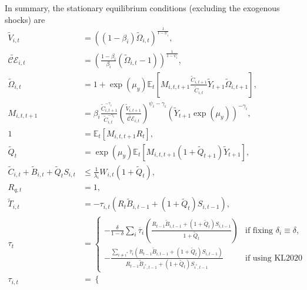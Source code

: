 \documentclass[12 pt, oneside]{article}
\theoremstyle{definition}
\theoremstyle{definition}
\theoremstyle{definition}
\newcommand{\E}{\mathbb{E}}
\newcommand{\calC}{\mathcal{C}}
\newcommand{\calE}{\mathcal{E}}
\begin{document}
In summary, the stationary equilibrium conditions (excluding the exogenous shocks) are
\begin{align}
  \label{eq:epstein zin defn eqm stat}
  \tilde{V}_{i, t} & = ((1 - \beta_i)\tilde{\Omega}_{i, t})^{\frac{1}{1 - \psi_i}},\\
  \label{eq:certainty equivalent eqm stat}
  \tilde{\calC\calE}_{i, t} & = \left(\frac{1 - \beta_i}{\beta_i}(\tilde{\Omega}_{i, t} - 1)\right)^{\frac{1}{1 - \psi_i}},\\
  \label{eq:epstein zin wealth recursion eqm stat}
  \tilde{\Omega}_{i, t} & = 1 + \exp(\mu_y)\E_t\left[M_{i, t, t + 1}\frac{\tilde{C}_{i, t + 1}}{\tilde{C}_{i, t}}\tilde{Y}_{t + 1}\tilde{\Omega}_{i, t + 1}\right],\\
  \label{eq:stochastic discount factor eqm stat}
  M_{i, t, t + 1} & = \beta_i\frac{\tilde{C}_{i, t + 1}^{- \gamma_i } }{\tilde{C}_{i, t}^{-\gamma_i} }\left(\frac{\tilde{V}_{i, t + 1}}{\tilde{\calC\calE}_{i, t}}\right)^{ \psi_i - \gamma_i}\left(\tilde{Y}_{t + 1}\exp(\mu_y)\right)^{-\gamma_i},\\
  \label{eq:euler eqn eqm stat}
  1 & = \E_t\left[M_{i, t, t + 1}R_t\right],\\
  \label{eq:tree asset pricing eqm stat}
  \tilde{Q}_t & = \exp(\mu_y)\E_t[M_{i, t, t + 1}(1 + \tilde{Q}_{t + 1})\tilde{Y}_{t + 1}],\\
  \label{eq:hh budget constraint with wealth share eqm stat}
  \tilde{C}_{i, t} + \tilde{B}_{i, t} + \tilde{Q}_t S_{i, t} & \leq \frac{1}{\lambda_i} W_{i, t} (1 + \tilde{Q}_t),\\
  \label{eq:Rq defn eqm stat}
  R_{q, t} & = 1,\\
  \label{eq:net transfer rule eqm stat}
  \tilde{T}_{i, t} & = -\tau_{i, t}(R_t \tilde{B}_{i, t - 1} + (1 + \tilde{Q}_t)S_{i, t - 1}),\\
  \label{eq:common tax rate eqm stat}
  \tau_t & =
\begin{cases}
  -\frac{\delta}{1 - \delta}\sum_i\overline{\tau}_i\left(\frac{R_{t - 1}\tilde{B}_{i, t - 1} + (1 + \tilde{Q}_t)S_{i, t - 1}}{1 + \tilde{Q}_t}\right) & \text{if fixing $\delta_i \equiv \delta$,}\\
  -\frac{\sum_{i\neq i^*} \overline{\tau}_i(R_{t - 1} \tilde{B}_{i, t - 1} + (1 + \tilde{Q}_t)S_{i, t - 1})}{R_{t - 1}\tilde{B}_{i^*, t - 1} + (1 + \tilde{Q}_t)S_{i^*, t - 1}} & \text{if using KL2020 tax rule,}
\end{cases}\\
  \label{eq:tax rate on type i eqm stat}
  \tau_{i, t} & = \begin{cases}

\end{cases}
\end{align}
\end{document}
